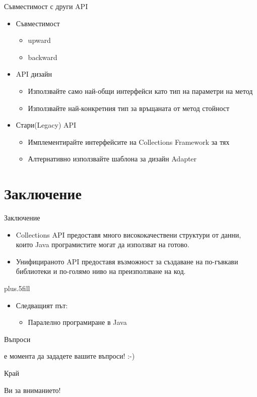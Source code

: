 \documentclass{beamer}
\begin{document}
\begin{frame}{Съвместимост с други API}
  \transdissolve
  \begin{itemize}
  \item Съвместимост
    \begin{itemize}
      \item upward
      \item backward
    \end{itemize}
    \item API дизайн
      \begin{itemize}
        \item Използвайте само най-общи интерфейси като тип на
          параметри на метод
        \item Използвайте най-конкретния тип за връщаната от метод стойност
      \end{itemize}
    \item Стари(Legacy) API
      \begin{itemize}
        \item Имплементирайте интерфейсите на Collections Framework за
          тях
        \item Алтернативно използвайте шаблона за дизайн Adapter
      \end{itemize}

  \end{itemize}
\end{frame}


\section*{Заключение}

\begin{frame}{Заключение}
  \transdissolve
  \begin{itemize}
  \item
    Collections API предоставя много висококачествени структури от
    данни, които Java програмистите могат да използват на готово.
  \item
    Унифицираното API предоставя възможност за създаване на по-гъвкави
    библиотеки и по-голямо ниво на преизползване на код.
  \end{itemize}
  
  \vskip0pt plus.5fill
  \begin{itemize}
  \item
    Следващият път:
    \begin{itemize}
    \item
      Паралелно програмиране в Java
    \end{itemize}
  \end{itemize}
\end{frame}

\begin{frame}{Въпроси}
  \transdissolve
  \begin{center}
     е момента да зададете вашите въпроси! :-)
  \end{center}
\end{frame}

\begin{frame}{Край}
  \transdissolve
  \begin{center}
     Ви за вниманието!
  \end{center}
\end{frame}
\end{document}
